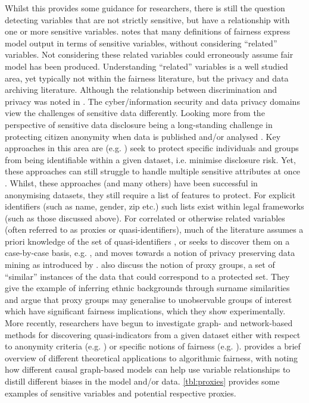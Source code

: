 Whilst this provides some guidance for \ml researchers, there is still the question detecting variables that are not strictly sensitive, but have a relationship with one or more sensitive variables.  notes that many definitions of fairness express model output in terms of sensitive variables, without considering ``related'' variables. Not considering these related variables could erroneously assume fair \ml model has been produced. Understanding ``related'' variables is a well studied area, yet typically not within the fairness literature, but the privacy and data archiving literature. Although the relationship between discrimination and privacy was noted in . The cyber/information security and data privacy domains view the challenges of sensitive data differently. Looking more from the perspective of sensitive data disclosure being a long-standing challenge in protecting citizen anonymity when data is published and/or analysed . Key approaches in this area are (e.g. ) seek to protect specific individuals and groups from being identifiable within a given dataset, i.e. minimise disclosure risk. Yet, these approaches can still struggle to handle multiple sensitive attributes at once . Whilst, these approaches (and many others) have been successful in anonymising datasets, they still require a list of features to protect. For explicit identifiers (such as name, gender, zip etc.) such lists exist within legal frameworks (such as those discussed above). For correlated or otherwise related variables (often referred to as proxies or quasi-identifiers), much of the literature assumes a priori knowledge of the set of quasi-identifiers , or seeks to discover them on a case-by-case basis, e.g. , and moves towards a notion of privacy preserving data mining as introduced by .  also discuss the notion of proxy groups, a set of ``similar'' instances of the data that could correspond to a protected set. They give the example of inferring ethnic backgrounds through surname similarities and argue that proxy groups may generalise to unobservable groups of interest which have significant fairness implications, which they show experimentally.
More recently, researchers have begun to investigate graph- and network-based methods for discovering quasi-indicators from a given dataset either with respect to anonymity criteria (e.g. ) or specific notions of fairness (e.g. ).  provides a brief overview of different theoretical applications to algorithmic fairness, with  noting how different causal graph-based models can help use variable relationships to distill different biases in the model and/or data. \autoref{tbl:proxies} provides some examples of sensitive variables and potential respective proxies.
